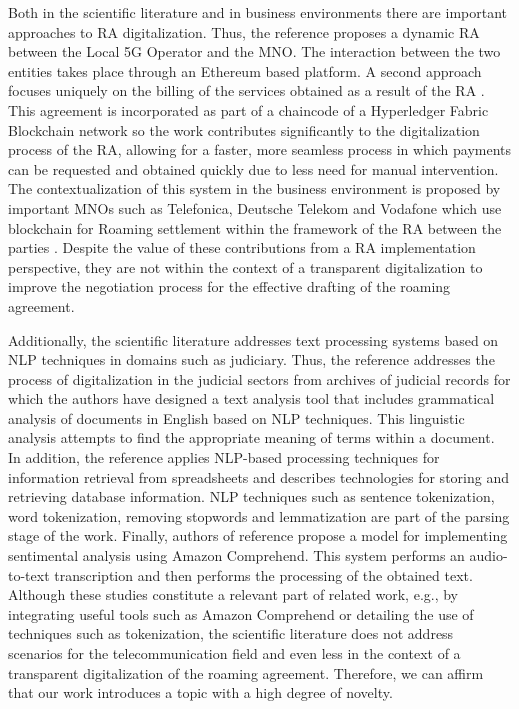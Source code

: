 \documentclass[conference]{style/IEEEtran}
\begin{document}
Both in the scientific literature and in business environments there are important approaches to RA digitalization. Thus, the reference \cite{9369516} proposes a dynamic RA between the Local 5G Operator and the MNO. The interaction between the two entities takes place through an Ethereum based platform. A second approach focuses uniquely on the billing of the services obtained as a result of the RA \cite{9024541}. This agreement is incorporated as part of a chaincode of a Hyperledger Fabric Blockchain network so the work contributes significantly to the digitalization process of the RA, allowing for a faster, more seamless process in which payments can be requested and obtained quickly due to less need for manual intervention. The contextualization of this system in the business environment is proposed by important MNOs such as Telefonica, Deutsche Telekom and Vodafone which use blockchain for Roaming settlement within the framework of the RA between the parties \cite{Huillet2020}. Despite the value of these contributions from a RA implementation perspective, they are not within the context of a transparent digitalization to improve the negotiation process for the effective drafting of the roaming agreement. 

Additionally, the scientific literature addresses text processing systems based on NLP techniques in domains such as judiciary. Thus, the reference \cite{8487847} addresses the process of digitalization in the judicial sectors from archives of judicial records for which the authors have designed a text analysis tool that includes grammatical analysis of documents in English based on NLP techniques. This linguistic analysis attempts to find the appropriate meaning of terms within a document. In addition, the reference \cite{9138070} applies NLP-based processing techniques for information retrieval from spreadsheets and describes technologies for storing and retrieving database information. NLP techniques such as sentence tokenization, word tokenization, removing stopwords and lemmatization are part of the parsing stage of the work. Finally, authors of reference \cite{9104105} propose a model for implementing sentimental analysis using Amazon Comprehend. This system performs an audio-to-text transcription and then performs the processing of the obtained text. Although these studies  constitute a relevant part of related work, e.g., by integrating useful tools such as Amazon Comprehend or detailing the use of techniques such as tokenization, the scientific literature does not address scenarios for the telecommunication field and even less in the context of a transparent digitalization of the roaming agreement. Therefore, we can affirm that our work introduces a topic with a high degree of novelty.
\end{document}
